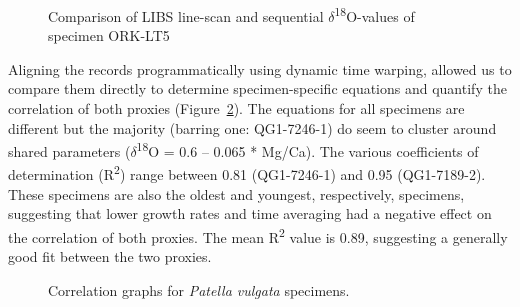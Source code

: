\documentclass[
  authoryear,
  preprint,
  3p]{elsarticle}
\begin{document}
\begin{figure}


\caption{\label{fig-Pat_Comp}Comparison of LIBS line-scan and sequential
\(\delta\)\textsuperscript{18}O-values of specimen ORK-LT5}

\end{figure}%

Aligning the records programmatically using dynamic time warping,
allowed us to compare them directly to determine specimen-specific
equations and quantify the correlation of both proxies
(Figure~\ref{fig-Pat_Corr}). The equations for all specimens are
different but the majority (barring one: QG1-7246-1) do seem to cluster
around shared parameters (\(\delta\)\textsuperscript{18}Ο = 0.6 -- 0.065
* Mg/Ca). The various coefficients of determination
(R\textsuperscript{2}) range between 0.81 (QG1-7246-1) and 0.95
(QG1-7189-2). These specimens are also the oldest and youngest,
respectively, specimens, suggesting that lower growth rates and time
averaging had a negative effect on the correlation of both proxies. The
mean R\textsuperscript{2} value is 0.89, suggesting a generally good fit
between the two proxies.

\begin{figure}


\caption{\label{fig-Pat_Corr}Correlation graphs for \emph{Patella
vulgata} specimens.}

\end{figure}%
\end{document}
